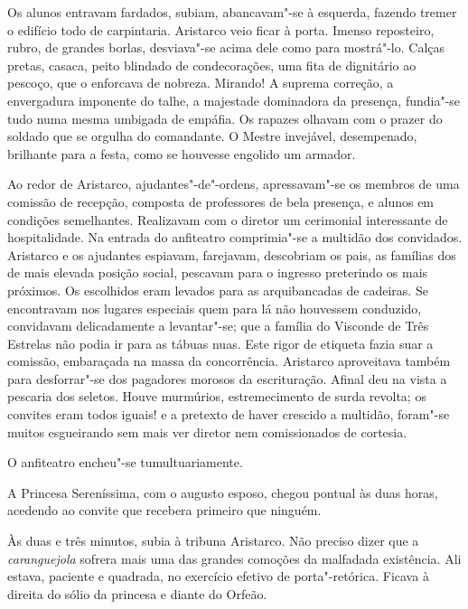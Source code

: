 Os alunos entravam fardados, subiam, abancavam"-se à
esquerda, fazendo tremer o edifício todo de carpintaria. Aristarco veio
ficar à porta. Imenso reposteiro, rubro, de grandes borlas,
desviava"-se acima dele como para mostrá"-lo. Calças pretas, casaca,
peito blindado de condecorações, uma fita de dignitário ao pescoço, que
o enforcava de nobreza. Mirando! A suprema correção, a envergadura
imponente do talhe, a majestade dominadora da presença, fundia"-se
tudo numa mesma umbigada de empáfia. Os rapazes olhavam com o prazer do
soldado que se orgulha do comandante. O Mestre invejável, desempenado,
brilhante para a festa, como se houvesse engolido um armador. 

Ao redor de Aristarco, ajudantes"-de"-ordens, apressavam"-se os membros de
uma comissão de recepção, composta de professores de bela presença, e
alunos em condições semelhantes. Realizavam com o diretor um cerimonial
interessante de hospitalidade. Na entrada do anfiteatro comprimia"-se
a multidão dos convidados. Aristarco e os ajudantes espiavam,
farejavam, descobriam os pais, as famílias dos de mais elevada posição
social, pescavam para o ingresso preterindo os mais próximos. Os
escolhidos eram levados para as arquibancadas de cadeiras. Se
encontravam nos lugares especiais quem para lá não houvessem conduzido,
convidavam delicadamente a levantar"-se; que a família do Visconde de
Três Estrelas não podia ir para as tábuas nuas. Este rigor de etiqueta
fazia suar a comissão, embaraçada na massa da concorrência. Aristarco
aproveitava também para desforrar"-se dos pagadores morosos da
escrituração. Afinal deu na vista a pescaria dos seletos. Houve
murmúrios, estremecimento de surda revolta; os convites eram todos
iguais! e a pretexto de haver crescido a multidão, foram"-se muitos
esgueirando sem mais ver diretor nem comissionados de
cortesia. 

O anfiteatro encheu"-se tumultuariamente. 

A Princesa Sereníssima, com o augusto esposo, chegou pontual às duas horas,
acedendo ao convite que recebera primeiro que ninguém. 

Às duas e três
minutos, subia à tribuna Aristarco. Não preciso dizer que a
\textit{caranguejola} sofrera mais uma das grandes comoções da malfadada
existência. Ali estava, paciente e quadrada, no exercício efetivo de
porta"-retórica. Ficava à direita do sólio da princesa e diante do Orfeão. 

